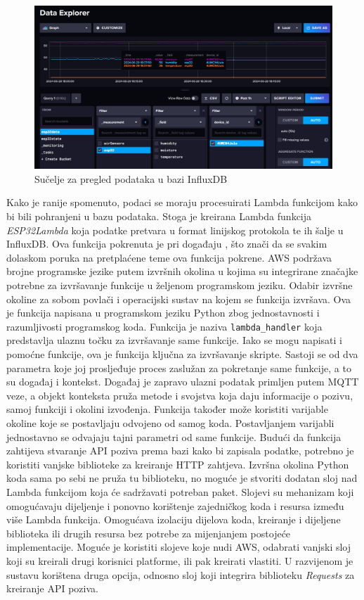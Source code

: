 \begin{figure}[ht]
	\centering
	\includegraphics[scale=0.4]{imgs/influxdb}
	\caption{Sučelje za pregled podataka u bazi InfluxDB}
	\label{fig:influxdb}
\end{figure}

Kako je ranije spomenuto, podaci se moraju procesuirati Lambda funkcijom kako bi bili pohranjeni u bazu podataka. Stoga je kreirana Lambda funkcija \textit{ESP32Lambda} koja podatke pretvara u format linijskog protokola te ih šalje u InfluxDB. Ova funkcija pokrenuta je pri događaju , što znači da se svakim dolaskom poruka na pretplaćene teme ova funkcija pokrene. AWS podržava brojne programske jezike putem izvršnih okolina u kojima su integrirane značajke potrebne za izvršavanje funkcije u željenom programskom jeziku. Odabir izvršne okoline za sobom povlači i operacijski sustav na kojem se funkcija izvršava. Ova je funkcija napisana u programskom jeziku Python zbog jednostavnosti i razumljivosti programskog koda. Funkcija je naziva \lstinline[language=python]|lambda_handler| koja predstavlja ulaznu točku  za izvršavanje same funkcije. Iako se mogu napisati i pomoćne funkcije, ova je funkcija ključna za izvršavanje skripte. Sastoji se od dva parametra koje joj prosljeđuje proces zaslužan za pokretanje same funkcije, a to su događaj i kontekst. Događaj je zapravo ulazni podatak primljen putem MQTT veze, a objekt konteksta pruža metode i svojstva koja daju informacije o pozivu, samoj funkciji i okolini izvođenja. Funkcija također može koristiti varijable okoline  koje se postavljaju odvojeno od samog koda. Postavljanjem varijabli jednostavno se odvajaju tajni parametri od same funkcije. Budući da funkcija zahtijeva stvaranje API poziva prema bazi kako bi zapisala podatke, potrebno je koristiti vanjske biblioteke za kreiranje HTTP zahtjeva. Izvršna okolina Python koda sama po sebi ne pruža tu biblioteku, no moguće je stvoriti dodatan sloj nad Lambda funkcijom koja će sadržavati potreban paket. Slojevi su mehanizam koji omogućavaju dijeljenje i ponovno korištenje zajedničkog koda i resursa između više Lambda funkcija. Omogućava izolaciju dijelova koda, kreiranje i dijeljene biblioteka ili drugih resursa bez potrebe za mijenjanjem postojeće implementacije. Moguće je koristiti slojeve koje nudi AWS, odabrati vanjski sloj koji su kreirali drugi korisnici platforme, ili pak kreirati vlastiti. U razvijenom je sustavu korištena druga opcija, odnosno sloj koji integrira biblioteku \textit{Requests} za kreiranje API poziva. 

